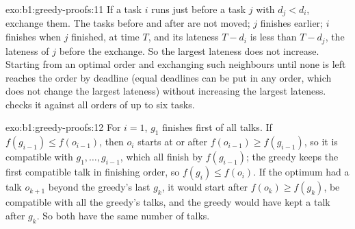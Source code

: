 \begin{solution}{exo:b1:greedy-proofs:11}
If a task $i$ runs just before a task $j$ with $d_j < d_i$, exchange them. The tasks before and after are not moved;
$j$ finishes earlier; $i$ finishes when $j$ finished, at time $T$, and its lateness $T - d_i$ is less than $T - d_j$,
the lateness of $j$ before the exchange. So the largest lateness does not increase. Starting from an optimal order and
exchanging such neighbours until none is left reaches the order by deadline (equal deadlines can be put in any order,
which does not change the largest lateness) without increasing the largest lateness.  checks
it against all orders of up to six tasks.
\end{solution}

\begin{solution}{exo:b1:greedy-proofs:12}
For $i = 1$, $g_1$ finishes first of all talks. If $f(g_{i-1}) \leq f(o_{i-1})$, then $o_i$ starts at or after
$f(o_{i-1}) \geq f(g_{i-1})$, so it is compatible with $g_1, \dots, g_{i-1}$, which all finish by $f(g_{i-1})$; the
greedy keeps the first compatible talk in finishing order, so $f(g_i) \leq f(o_i)$. If the optimum had a talk
$o_{k+1}$ beyond the greedy's last $g_k$, it would start after $f(o_k) \geq f(g_k)$, be compatible with all the
greedy's talks, and the greedy would have kept a talk after $g_k$. So both have the same number of talks.
\end{solution}

